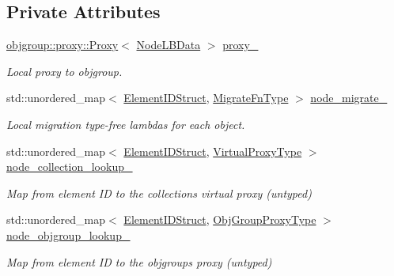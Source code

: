 \subsection*{Private Attributes}
\begin{DoxyCompactItemize}
\item 
\hyperlink{structvt_1_1objgroup_1_1proxy_1_1_proxy}{objgroup\+::proxy\+::\+Proxy}$<$ \hyperlink{structvt_1_1vrt_1_1collection_1_1balance_1_1_node_l_b_data}{Node\+L\+B\+Data} $>$ \hyperlink{structvt_1_1vrt_1_1collection_1_1balance_1_1_node_l_b_data_a72ce69b4edce524cd5960eb3ed856f26}{proxy\+\_\+}
\begin{DoxyCompactList}\small\item\em Local proxy to objgroup. \end{DoxyCompactList}\item 
std\+::unordered\+\_\+map$<$ \hyperlink{namespacevt_1_1vrt_1_1collection_1_1balance_a9f5b53fafb270212279a4757d2c4cd28}{Element\+I\+D\+Struct}, \hyperlink{structvt_1_1vrt_1_1collection_1_1balance_1_1_node_l_b_data_a200140e389d08dc8d74db16589e736bc}{Migrate\+Fn\+Type} $>$ \hyperlink{structvt_1_1vrt_1_1collection_1_1balance_1_1_node_l_b_data_a4e325cee830c96b4c4129538367fbf37}{node\+\_\+migrate\+\_\+}
\begin{DoxyCompactList}\small\item\em Local migration type-\/free lambdas for each object. \end{DoxyCompactList}\item 
std\+::unordered\+\_\+map$<$ \hyperlink{namespacevt_1_1vrt_1_1collection_1_1balance_a9f5b53fafb270212279a4757d2c4cd28}{Element\+I\+D\+Struct}, \hyperlink{namespacevt_a1b417dd5d684f045bb58a0ede70045ac}{Virtual\+Proxy\+Type} $>$ \hyperlink{structvt_1_1vrt_1_1collection_1_1balance_1_1_node_l_b_data_a87a5425b7dd71812ba4952340cf01946}{node\+\_\+collection\+\_\+lookup\+\_\+}
\begin{DoxyCompactList}\small\item\em Map from element ID to the collection\textquotesingle{}s virtual proxy (untyped) \end{DoxyCompactList}\item 
std\+::unordered\+\_\+map$<$ \hyperlink{namespacevt_1_1vrt_1_1collection_1_1balance_a9f5b53fafb270212279a4757d2c4cd28}{Element\+I\+D\+Struct}, \hyperlink{namespacevt_ad7cae989df485fccca57f0792a880a8e}{Obj\+Group\+Proxy\+Type} $>$ \hyperlink{structvt_1_1vrt_1_1collection_1_1balance_1_1_node_l_b_data_a168baa5b6f532b6f37431ef4e7f7e48e}{node\+\_\+objgroup\+\_\+lookup\+\_\+}
\begin{DoxyCompactList}\small\item\em Map from element ID to the objgroup\textquotesingle{}s proxy (untyped) \end{DoxyCompactList}\item 

\end{DoxyCompactItemize}
